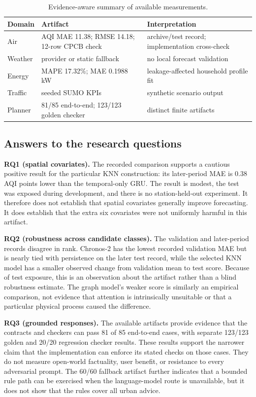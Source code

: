\documentclass[conference]{IEEEtran}
\begin{document}
\begin{table}[t]
\caption{Evidence-aware summary of available measurements.}
\label{tab:summary}
\centering\scriptsize
\begin{tabular}{@{}p{1.0cm}p{2.05cm}p{2.05cm}@{}}
\toprule
Domain & Artifact & Interpretation\\
\midrule
Air & AQI MAE 11.38; RMSE 14.18; 12-row CPCB check & archive/test record; implementation cross-check\\
Weather & provider or static fallback & no local forecast validation\\
Energy & MAPE 17.32\%; MAE 0.1988 kW & leakage-affected household profile fit\\
Traffic & seeded SUMO KPIs & synthetic scenario output\\
Planner & 81/85 end-to-end; 123/123 golden checker & distinct finite artifacts\\
\bottomrule
\end{tabular}
\end{table}

\subsection{Answers to the research questions}
\textbf{RQ1 (spatial covariates).} The recorded comparison supports a cautious positive result for the particular KNN construction: its later-period MAE is 0.38 AQI points lower than the temporal-only GRU. The result is modest, the test was exposed during development, and there is no station-held-out experiment. It therefore does not establish that spatial covariates generally improve forecasting. It does establish that the extra six covariates were not uniformly harmful in this artifact.

\textbf{RQ2 (robustness across candidate classes).} The validation and later-period records disagree in rank. Chronos-2 has the lowest recorded validation MAE but is nearly tied with persistence on the later test record, while the selected KNN model has a smaller observed change from validation mean to test score. Because of test exposure, this is an observation about the artifact rather than a blind robustness estimate. The graph model's weaker score is similarly an empirical comparison, not evidence that attention is intrinsically unsuitable or that a particular physical process caused the difference.

\textbf{RQ3 (grounded responses).} The available artifacts provide evidence that the contracts and checkers can pass 81 of 85 end-to-end cases, with separate 123/123 golden and 20/20 regression checker results. These results support the narrower claim that the implementation can enforce its stated checks on those cases. They do not measure open-world factuality, user benefit, or resistance to every adversarial prompt. The 60/60 fallback artifact further indicates that a bounded rule path can be exercised when the language-model route is unavailable, but it does not show that the rules cover all urban advice.
\end{document}
